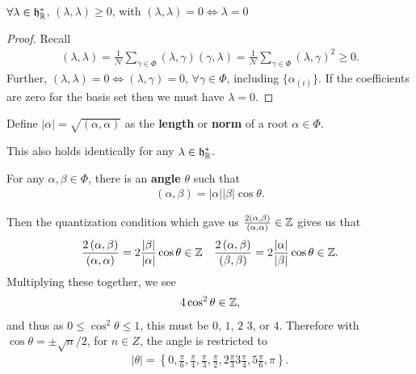 \begin{claim}
    $\forall \lambda \in \mathfrak{h}_{\mathbb{R}}^{*}$, $\left( \lambda, \lambda \right) \geq 0$, with $\left( \lambda, \lambda \right) = 0 \iff \lambda = 0$
\end{claim}

\begin{proof}
    Recall
    \begin{align}
        \left( \lambda, \lambda \right) = \frac{1}{\mathcal{N}} \sum_{\gamma \in \Phi}^{} \left( \lambda, \gamma \right) \left( \gamma, \lambda \right)  = \frac{1}{\mathcal{N}} \sum_{\gamma \in \Phi}^{} \left( \lambda, \gamma \right)^2 \geq 0
    .\end{align}
    Further, $\left( \lambda , \lambda\right) = 0 \iff \left( \lambda, \gamma \right) = 0$, $\forall \gamma \in \Phi$, including $\{\alpha_{\left( i \right) }\}$. If the coefficients are zero for the basis set then we must have $\lambda = 0$.
\end{proof}

\begin{definition}
    Define $\left| \alpha \right| = \sqrt{\left( \alpha , \alpha \right) } $ as the \textbf{length} or \textbf{norm} of a root $\alpha \in \Phi$.
\end{definition}

This also holds identically for any $\lambda \in \mathfrak{h}^{*}_{\mathbb{R}}$.

For any $\alpha, \beta \in \Phi$, there is an \textbf{angle} $\theta$ such that
\begin{align}
    \left( \alpha, \beta \right) = \left| \alpha \right| \left| \beta \right| \cos \theta
.\end{align}

Then the quantization condition which gave us $\frac{2 \left( \alpha, \beta \right) }{\left( \alpha , \alpha \right) } \in \mathbb{Z}$ gives us that
\begin{align}
    \frac{2 \left( \alpha, \beta \right) }{\left( \alpha , \alpha \right) } = 2 \frac{\left| \beta \right| }{\left| \alpha \right| } \cos \theta \in \mathbb{Z} && \frac{2 \left( \alpha, \beta \right) }{\left( \beta, \beta \right) } = 2 \frac{\left| \alpha \right| }{\left| \beta \right| } \cos \theta \in \mathbb{Z}
.\end{align}
Multiplying these together, we see
\begin{align}
    4 \cos^2 \theta \in \mathbb{Z}
,\end{align}
and thus as $0 \leq \cos^2 \theta \leq 1$, this must be $0$, $1$, $2$ $3$, or $4$. Therefore with $\cos \theta = \pm \sqrt{n}/2$, for $n \in Z$, the angle is restricted to
\begin{align}
    \left| \theta \right| = \left\{ 0, \frac{\pi}{6}, \frac{\pi}{4}, \frac{\pi}{3}, \frac{\pi}{2}, 2 \frac{\pi}{3} 3 \frac{\pi}{4}, 5 \frac{\pi}{6} , \pi \right\} 
.\end{align}

